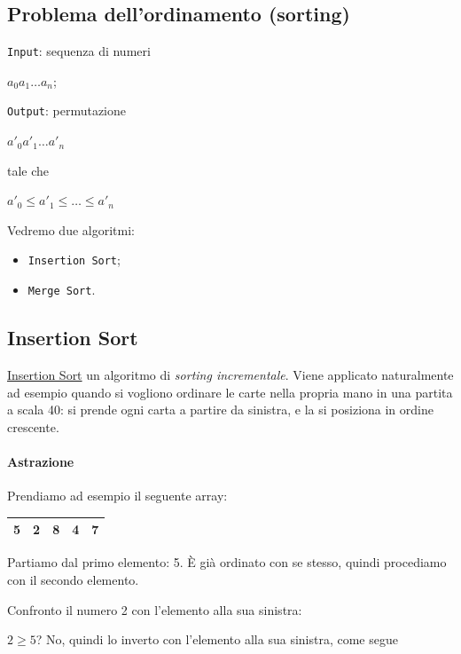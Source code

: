 \subsection{Problema dell'ordinamento (sorting)}
\texttt{Input}: sequenza di numeri 
\begin{center}
	$a_0 a_1 \dots a_n$;\par
\end{center}
\texttt{Output}: permutazione
\begin{center}
	$a'_0 a'_1 \dots a'_n$
\end{center}
tale che 
\begin{center}
	$a'_0 \leq a'_1 \leq \dots \leq a'_n$
\end{center}

\noindent Vedremo due algoritmi:
\begin{itemize}[noitemsep]
	\item \texttt{Insertion Sort};
	\item \texttt{Merge Sort}.
\end{itemize}

\subsection{Insertion Sort} \label{insertionsort}
\href{https://en.wikipedia.org/wiki/Insertion_sort}{Insertion Sort} un algoritmo di \emph{sorting incrementale}. Viene applicato naturalmente ad esempio quando si vogliono ordinare le carte nella propria mano in una partita a scala 40: si prende ogni carta a partire da sinistra, e la si posiziona in ordine crescente.\par
\paragraph{Astrazione} Prendiamo ad esempio il seguente array:

\begin{center}
	\begin{tabular}{|l|l|l|l|l|}
		\hline
		5 & 2 & 8 & 4 & 7 \\
		\hline
	\end{tabular}
\end{center}

\noindent Partiamo dal primo elemento: 5. È già ordinato con se stesso, quindi procediamo con il secondo elemento.\par
\noindent Confronto il numero 2 con l'elemento alla sua sinistra: \par
$2 \geq 5$?  No, quindi lo inverto con l'elemento alla sua sinistra, come segue

